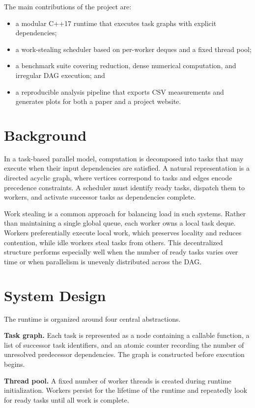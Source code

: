 \documentclass[10pt]{article}
\begin{document}
The main contributions of the project are:
\begin{itemize}
    \item a modular C++17 runtime that executes task graphs with explicit dependencies;
    \item a work-stealing scheduler based on per-worker deques and a fixed thread pool;
    \item a benchmark suite covering reduction, dense numerical computation, and irregular DAG execution; and
    \item a reproducible analysis pipeline that exports CSV measurements and generates plots for both a paper and a project website.
\end{itemize}

\section{Background}
In a task-based parallel model, computation is decomposed into tasks that may execute when their input dependencies are satisfied. A natural representation is a directed acyclic graph, where vertices correspond to tasks and edges encode precedence constraints. A scheduler must identify ready tasks, dispatch them to workers, and activate successor tasks as dependencies complete.

Work stealing is a common approach for balancing load in such systems. Rather than maintaining a single global queue, each worker owns a local task deque. Workers preferentially execute local work, which preserves locality and reduces contention, while idle workers steal tasks from others. This decentralized structure performs especially well when the number of ready tasks varies over time or when parallelism is unevenly distributed across the DAG.

\section{System Design}
The runtime is organized around four central abstractions.

\textbf{Task graph.} Each task is represented as a node containing a callable function, a list of successor task identifiers, and an atomic counter recording the number of unresolved predecessor dependencies. The graph is constructed before execution begins.

\textbf{Thread pool.} A fixed number of worker threads is created during runtime initialization. Workers persist for the lifetime of the runtime and repeatedly look for ready tasks until all work is complete.
\end{document}
